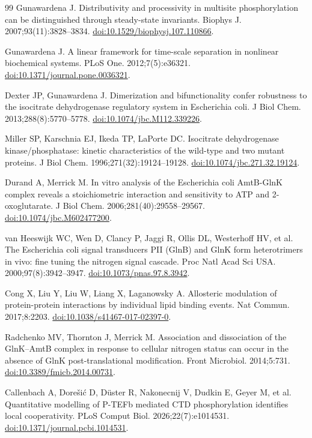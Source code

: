 \documentclass[10pt,letterpaper]{article}
\begin{document}
\begin{thebibliography}{99}
Gunawardena J. Distributivity and processivity in multisite phosphorylation can be distinguished through steady-state invariants. Biophys J. 2007;93(11):3828--3834. \href{https://doi.org/10.1529/biophysj.107.110866}{doi:10.1529/biophysj.107.110866}.

Gunawardena J. A linear framework for time-scale separation in nonlinear biochemical systems. PLoS One. 2012;7(5):e36321. \href{https://doi.org/10.1371/journal.pone.0036321}{doi:10.1371/journal.pone.0036321}.

Dexter JP, Gunawardena J. Dimerization and bifunctionality confer robustness to the isocitrate dehydrogenase regulatory system in Escherichia coli. J Biol Chem. 2013;288(8):5770--5778. \href{https://doi.org/10.1074/jbc.M112.339226}{doi:10.1074/jbc.M112.339226}.

Miller SP, Karschnia EJ, Ikeda TP, LaPorte DC. Isocitrate dehydrogenase kinase/phosphatase: kinetic characteristics of the wild-type and two mutant proteins. J Biol Chem. 1996;271(32):19124--19128. \href{https://doi.org/10.1074/jbc.271.32.19124}{doi:10.1074/jbc.271.32.19124}.

Durand A, Merrick M. In vitro analysis of the Escherichia coli AmtB-GlnK complex reveals a stoichiometric interaction and sensitivity to ATP and 2-oxoglutarate. J Biol Chem. 2006;281(40):29558--29567. \href{https://doi.org/10.1074/jbc.M602477200}{doi:10.1074/jbc.M602477200}.

van Heeswijk WC, Wen D, Clancy P, Jaggi R, Ollis DL, Westerhoff HV, et al. The Escherichia coli signal transducers PII (GlnB) and GlnK form heterotrimers in vivo: fine tuning the nitrogen signal cascade. Proc Natl Acad Sci USA. 2000;97(8):3942--3947. \href{https://doi.org/10.1073/pnas.97.8.3942}{doi:10.1073/pnas.97.8.3942}.

Cong X, Liu Y, Liu W, Liang X, Laganowsky A. Allosteric modulation of protein-protein interactions by individual lipid binding events. Nat Commun. 2017;8:2203. \href{https://doi.org/10.1038/s41467-017-02397-0}{doi:10.1038/s41467-017-02397-0}.

Radchenko MV, Thornton J, Merrick M. Association and dissociation of the GlnK--AmtB complex in response to cellular nitrogen status can occur in the absence of GlnK post-translational modification. Front Microbiol. 2014;5:731. \href{https://doi.org/10.3389/fmicb.2014.00731}{doi:10.3389/fmicb.2014.00731}.

Callenbach A, Dorešić D, Düster R, Nakonecnij V, Dudkin E, Geyer M, et al. Quantitative modelling of P-TEFb mediated CTD phosphorylation identifies local cooperativity. PLoS Comput Biol. 2026;22(7):e1014531. \href{https://doi.org/10.1371/journal.pcbi.1014531}{doi:10.1371/journal.pcbi.1014531}.


\end{thebibliography}
\end{document}

